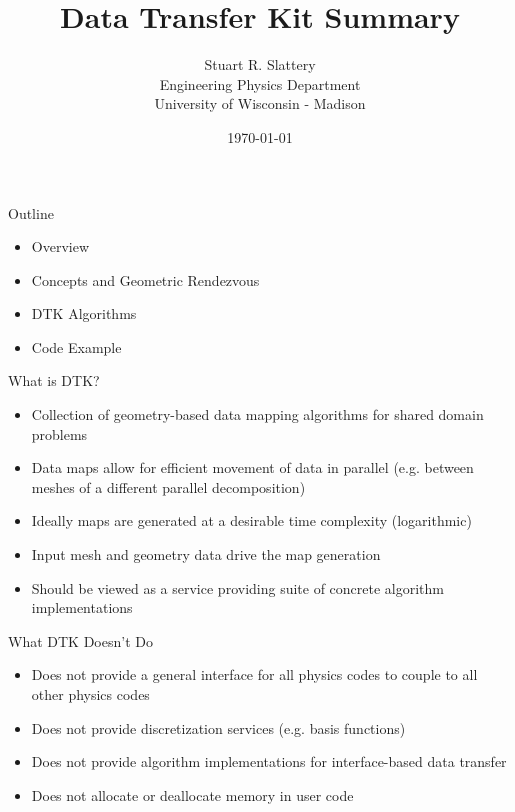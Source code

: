 \documentclass{beamer}
\author{Stuart R. Slattery
  \\ Engineering Physics Department
  \\ University of Wisconsin - Madison
}
\date{\today}
\title{Data Transfer Kit Summary}
\begin{document}
\maketitle

\begin{frame}{Outline}

  \begin{itemize}
  \item Overview
    \medskip
  \item Concepts and Geometric Rendezvous
    \medskip
  \item DTK Algorithms
    \medskip
  \item Code Example
  \end{itemize}

\end{frame}

\begin{frame}{What is DTK?}

  \begin{itemize}
  \item Collection of geometry-based data mapping algorithms for
    shared domain problems
    \medskip
  \item Data maps allow for efficient movement of data in parallel
    (e.g. between meshes of a different parallel decomposition)
    \medskip
  \item Ideally maps are generated at a desirable time complexity
    (logarithmic)
    \medskip
  \item Input mesh and geometry data drive the map generation
    \medskip
  \item Should be viewed as a service providing suite of concrete
    algorithm implementations
  \end{itemize}
 
\end{frame}

\begin{frame}{What DTK Doesn't Do}

  \begin{itemize}
  \item Does not provide a general interface for all physics codes to
    couple to all other physics codes
    \medskip
  \item Does not provide discretization services (e.g. basis functions)
    \medskip
  \item Does not provide algorithm implementations for interface-based
    data transfer
    \medskip
  \item Does not allocate or deallocate memory in user code
  \end{itemize}

\end{frame}
\end{document}
